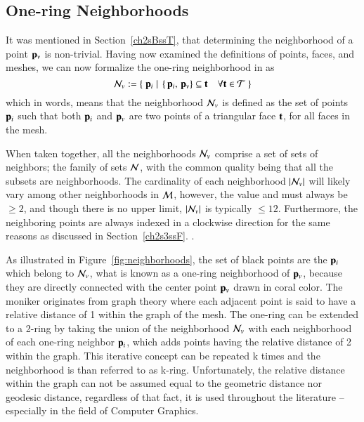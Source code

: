 %
%
%
\subsection{One-ring Neighborhoods}
\label{ch2s3ssNRN}
It was mentioned in Section~\ref{ch2sBssT}, that determining the neighborhood of a point $\mathbf{p}_v$ is non-trivial. Having now examined the definitions of points, faces, and meshes, we can now formalize the one-ring neighborhood in \tdd{} as
%
\begin{equation}
	\mathcal{N}_v := \left \{\;\mathbf{p}_i\;|\;\left \{\,\mathbf{p}_i,\,\mathbf{p}_v\right \} \subseteq \mathbf{t} \quad \forall \mathbf{t} \in \mathcal{T}\;\right \}
	\label{eq:defineNeighborhood}
\end{equation}%
%
%
%
which in words, means that the neighborhood $\mathcal{N}_v$ is defined as the set of points $\mathbf{p}_i$ such that both $\mathbf{p}_i$ and $\mathbf{p}_v$ are two points of a triangular face $\mathbf{t}$, for all faces in the mesh.

When taken together, all the neighborhoods $\mathcal{N}_v$ comprise a set of sets of neighbors; the family of sets $\mathcal{N}$, with the common quality being that all the subsets are neighborhoods. The cardinality of each neighborhood $|\mathcal{N}_v|$ will likely vary among other neighborhoods in $\mathcal{M}$, however, the value and must always be $\geq 2$, and though there is no upper limit, $|\mathcal{N}_v|$ is typically $\leq 12$. Furthermore, the neighboring points are always indexed in a clockwise direction for the same reasons as discussed in Section~\ref{ch2s3ssF}.
%
.%

As illustrated in Figure~\ref{fig:neighborhoods}, the set of black points are the $\mathbf{p}_i$ which belong to $\mathcal{N}_v$, what is known as a one-ring neighborhood of $\mathbf{p}_v$, because they are directly connected with the center point $\mathbf{p}_v$ drawn in coral color. The moniker originates from graph theory where each adjacent point is said to have a relative distance of 1 within the graph of the mesh. The one-ring can be extended to a 2-ring by taking the union of the neighborhood $\mathcal{N}_v$ with each neighborhood of each one-ring neighbor $\mathbf{p}_i$, which adds points having the relative distance of 2 within the graph. This iterative concept can be repeated k times and the neighborhood is than referred to as k-ring. Unfortunately, the relative distance within the graph can not be assumed equal to the geometric distance nor geodesic distance, regardless of that fact, it is used throughout the literature – especially in the field of Computer Graphics.~\cite[p.~29]{Mara12}

